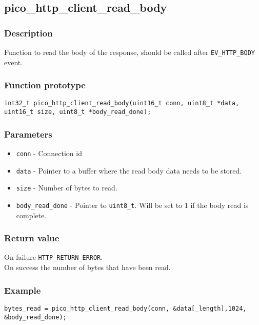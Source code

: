 
\subsection{pico\_http\_client\_read\_body}

\subsubsection*{Description}
Function to read the body of the response, should be called after \texttt{EV\_HTTP\_BODY} event.

\subsubsection*{Function prototype}
\texttt{int32\_t pico\_http\_client\_read\_body(uint16\_t conn, uint8\_t *data, uint16\_t size, uint8\_t *body\_read\_done);}

\subsubsection*{Parameters}
\begin{itemize}[noitemsep]
\item \texttt{conn} - Connection id
\item \texttt{data} - Pointer to a buffer where the read body data needs to be stored.
\item \texttt{size} - Number of bytes to read.
\item \texttt{body\_read\_done} - Pointer to \texttt{uint8\_t}. Will be set to 1 if the body read is complete.
\end{itemize}
\subsubsection*{Return value}
On failure \texttt{HTTP\_RETURN\_ERROR}.
\\On success the number of bytes that have been read.
\subsubsection*{Example}
\begin{verbatim}
bytes_read = pico_http_client_read_body(conn, &data[_length],1024, &body_read_done);
\end{verbatim}
